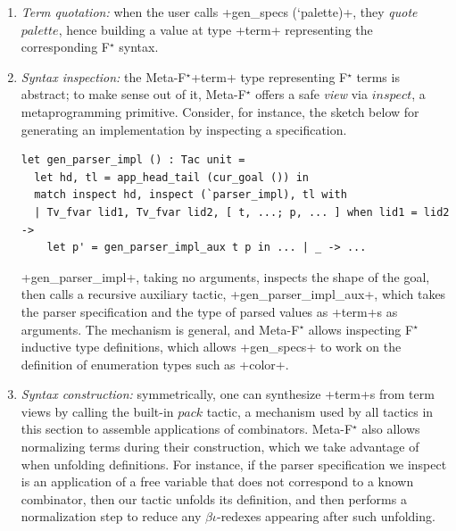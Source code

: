 \documentclass[runningheads]{llncs}
\newcommand\fstar{F$^\star$\xspace}
\newcommand\metafstar{Meta-F$^\star$\xspace}
\begin{document}
\begin{enumerate}
\item \emph{Term quotation:} when the user calls \ls+gen_specs (`palette)+, they
  \emph{quote} \ls$palette$, hence building a value at type \ls+term+
    representing the corresponding \fstar syntax.

\item \emph{Syntax inspection:} the \metafstar \ls+term+ type representing \fstar terms
  is abstract; to make sense out of it, \metafstar offers a safe \emph{view}
    via \ls$inspect$, a metaprogramming primitive. Consider, for
    instance, the sketch below for generating an implementation by inspecting a
    specification.
\begin{lstlisting}
let gen_parser_impl () : Tac unit =
  let hd, tl = app_head_tail (cur_goal ()) in
  match inspect hd, inspect (`parser_impl), tl with
  | Tv_fvar lid1, Tv_fvar lid2, [ t, ...; p, ... ] when lid1 = lid2 ->
    let p' = gen_parser_impl_aux t p in ... | _ -> ...
\end{lstlisting}
    \ls+gen_parser_impl+, taking no arguments,
    inspects the shape of the goal, then calls a recursive auxiliary tactic,
    \ls+gen_parser_impl_aux+, which takes the parser specification and the
    type of parsed values as \ls+term+s as arguments. The mechanism is
    general, and \metafstar allows inspecting \fstar inductive type definitions, which
    allows \ls+gen_specs+ to work on the definition of enumeration types
    such as \ls+color+.

\item \emph{Syntax construction:}
  symmetrically, one can synthesize \ls+term+s from term views by calling the built-in
    \ls$pack$  tactic, a
    mechanism used by all tactics in this section to assemble applications of
    combinators. \metafstar also allows normalizing terms during their construction,
    which we take advantage of when unfolding definitions. For instance, if the
    parser specification we inspect is an application of a free variable that does not
    correspond to a known combinator, then our tactic unfolds its definition,
    and then performs a normalization step to reduce any $\beta\iota$-redexes
    appearing after such unfolding.



\end{enumerate}
\end{document}

